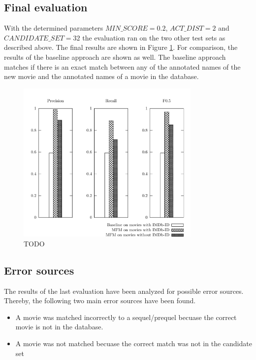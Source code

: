 \subsection{Final evaluation}
With the determined parameters $MIN\_SCORE = 0.2$, $ACT\_DIST = 2$ and $CANDIDATE\_SET = 32$ the evaluation ran on the two other test sets as described above.
The final results are shown in Figure \ref{fig_baseline}.
For comparison, the results of the baseline approach are shown as well.
The baseline approach matches if there is an exact match between any of the annotated names of the new movie and the annotated names of a movie in the database.

\begin{figure}[h!]
  \begin{center}
  \includegraphics[width=0.8\textwidth]{images/baseline.pdf}
  \end{center}
  \caption{TODO}
  \label{fig_baseline}
\end{figure}

\subsection{Error sources}
The results of the last evaluation have been analyzed for possible error sources.
Thereby, the following two main error sources have been found.

\begin{itemize}
	\item A movie was matched incorrectly to a sequel/prequel becuase the correct movie is not in the database.
	\item A movie was not matched becuase the correct match was not in the candidate set
\end{itemize}
